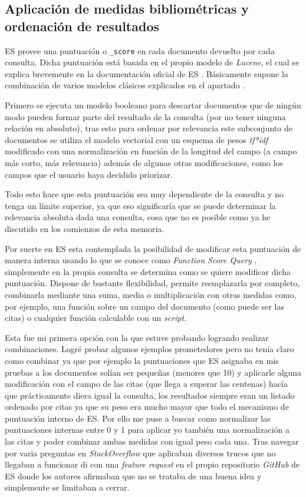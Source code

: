 \subsection{Aplicación de medidas bibliométricas y ordenación de resultados}
\acrlong{ES} provee una puntuación o \texttt{\_score} en cada documento devuelto por cada consulta. Dicha puntuación está basada en el propio modelo de \textit{Lucene}, el cual se explica brevemente en la documentación oficial de \acrshort{ES} \cite{ES_scoring}. Básicamente supone la combinación de varios modelos clásicos explicados en el apartado . 

Primero se ejecuta un modelo booleano para descartar documentos que de ningún modo pueden formar parte del resultado de la consulta (por no tener ninguna relación en absoluto), tras esto para ordenar por relevancia este subconjunto de documentos se utiliza el modelo vectorial con un esquema de pesos \textit{tf*idf} modificado con una normalización en función de la longitud del campo (a campo más corto, más relevancia) además de algunas otras modificaciones, como los campos que el usuario haya decidido priorizar.

Todo esto hace que esta puntuación sea muy dependiente de la consulta y no tenga un límite superior, ya que eso significaría que se puede determinar la relevancia absoluta dada una consulta, cosa que no es posible como ya he discutido en los comienzos de esta memoria. 

Por suerte en \acrshort{ES} esta contemplada la posibilidad de modificar esta puntuación de manera interna usando lo que se conoce como \textit{Function Score Query} \cite{ES_func_score}, simplemente en la propia consulta se determina como se quiere modificar dicha puntuación. Dispone de bastante flexibilidad, permite reemplazarla por completo, combinarla mediante una suma, media o multiplicación con otras medidas como, por ejemplo, una función sobre un campo del documento (como puede ser las citas) o cualquier función calculable con un \textit{script}. 

Esta fue mi primera opción con la que estuve probando logrando realizar combinaciones. Logré probar algunos ejemplos prometedores pero no tenía claro como combinar ya que por ejemplo la puntuaciones que \acrshort{ES} asignaba en mis pruebas a los documentos solían ser pequeñas (menores que 10) y aplicarle alguna modificación con el campo de las citas (que llega a superar las centenas) hacía que prácticamente diera igual la consulta, los resultados siempre eran un listado ordenado por citas ya que su peso era mucho mayor que todo el mecanismo de puntuación interno de \acrshort{ES}. Por ello me puse a buscar como normalizar las puntuaciones internas entre 0 y 1 para aplicar yo también una normalización a las citas y poder combinar ambas medidas con igual peso cada una. Tras navegar por varia preguntas en \textit{StackOverflow} que aplicaban diversos trucos que no llegaban a funcionar di con una \textit{feature request} en el propio repositorio \textit{GitHub} de \acrshort{ES} \cite{ES_normalize_score} donde los autores afirmaban que no se trataba de una buena idea y simplemente se limitaban a cerrar.

